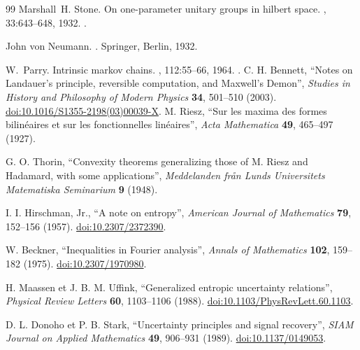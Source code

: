 \begin{thebibliography}{99}
Marshall~H. Stone.
\newblock On one-parameter unitary groups in hilbert space.
, 33:643--648, 1932.
\newblock \href {https://doi.org/10.2307/1968538} {}.

John von Neumann.
.
\newblock Springer, Berlin, 1932.

W.~Parry.
\newblock Intrinsic markov chains.
, 112:55--66,
  1964.
\newblock \href {https://doi.org/10.1090/S0002-9947-1964-0161372-1}
  {}.
 C. H. Bennett, ``Notes on Landauer's principle,
reversible computation, and Maxwell's Demon'', \emph{Studies in History
and Philosophy of Modern Physics} \textbf{34}, 501--510 (2003).
\href{https://doi.org/10.1016/S1355-2198(03)00039-X}{doi:10.1016/S1355-2198(03)00039-X}.
M. Riesz, ``Sur les maxima des formes bilinéaires et sur les
fonctionnelles linéaires'', \emph{Acta Mathematica} \textbf{49},
465--497 (1927).

G. O. Thorin, ``Convexity theorems generalizing those of M. Riesz and
Hadamard, with some applications'',
\emph{Meddelanden från Lunds Universitets Matematiska Seminarium}
\textbf{9} (1948).

I. I. Hirschman, Jr., ``A note on entropy'',
\emph{American Journal of Mathematics} \textbf{79}, 152--156 (1957).
\href{https://doi.org/10.2307/2372390}{doi:10.2307/2372390}.

W. Beckner, ``Inequalities in Fourier analysis'',
\emph{Annals of Mathematics} \textbf{102}, 159--182 (1975).
\href{https://doi.org/10.2307/1970980}{doi:10.2307/1970980}.

H. Maassen et J. B. M. Uffink, ``Generalized entropic uncertainty
relations'', \emph{Physical Review Letters} \textbf{60},
1103--1106 (1988).
\href{https://doi.org/10.1103/PhysRevLett.60.1103}{doi:10.1103/PhysRevLett.60.1103}.

D. L. Donoho et P. B. Stark, ``Uncertainty principles and signal
recovery'', \emph{SIAM Journal on Applied Mathematics} \textbf{49},
906--931 (1989).
\href{https://doi.org/10.1137/0149053}{doi:10.1137/0149053}.

\end{thebibliography}

\par\endgroup
